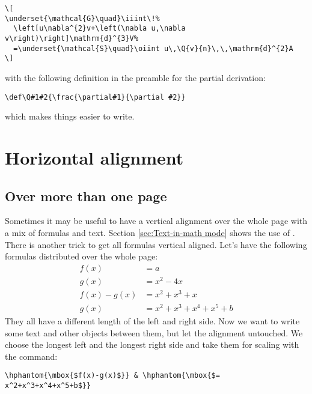 \begin{table}[htb]
\begin{lstlisting}
\[
\underset{\mathcal{G}\quad}\iiint\!%
  \left[u\nabla^{2}v+\left(\nabla u,\nabla v\right)\right]\mathrm{d}^{3}V%
  =\underset{\mathcal{S}\quad}\oiint u\,\Q{v}{n}\,\,\mathrm{d}^{2}A
\]
\end{lstlisting}

\noindent with the following definition in the preamble for the partial derivation:

\begin{lstlisting}
\def\Q#1#2{\frac{\partial#1}{\partial #2}}
\end{lstlisting}

\noindent which makes things easier to write.

\section{Horizontal alignment}\label{sec:verticalAlignment}
\subsection{Over more than one page}
Sometimes it may be useful to have a vertical alignment over the whole page with a mix of    %
formulas and text. Section \ref{sec:Text-in-math mode} shows the use of .
There is another trick to get all formulas vertical aligned.  Let's have the following
formulas distributed over the whole page:
%
\begin{align*}
     f(x) &= a\\
     g(x) &= x^2-4x\\
f(x)-g(x) &= x^2+x^3+x\\
     g(x) &= x^2+x^3+x^4+x^5+b
\end{align*}
%
They all have a different length of the left and right side. Now we want to write some
text and other objects between them, but let the alignment untouched. We choose the
longest left and the longest right side and take them for scaling with the 
command:

\begin{verbatim}
\hphantom{\mbox{$f(x)-g(x)$}} & \hphantom{\mbox{$= x^2+x^3+x^4+x^5+b$}}
\end{verbatim}


\end{table}
